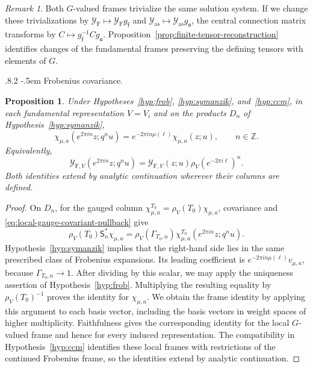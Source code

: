 \documentclass[11pt,leqno]{amsart}
\makeatletter
\numberwithin{equation}{section}
\renewcommand\paragraph{\@startsection{paragraph}{4}{\z@}%
  {.8\baselineskip \@plus .2\baselineskip}%
  {-.5em}%
  {\normalfont\normalsize\bfseries}}
\theoremstyle{plain}
\newtheorem{proposition}[theorem]{Proposition}
\theoremstyle{definition}
\theoremstyle{plain}
\theoremstyle{definition}
\theoremstyle{remark}
\newtheorem{remark}[theorem]{Remark}
\makeatother
\begin{document}
\begin{remark}\label{rem:analytic-comparison-scope}
Both $G$-valued frames trivialize the same solution system.  If we change these trivializations by $\mathcal Y_{\mathrm F}\mapsto\mathcal Y_{\mathrm F}g_{\mathfrak f}$ and $\mathcal Y_{\mathrm{as}}\mapsto\mathcal Y_{\mathrm{as}}g_{\mathfrak a}$, the central connection matrix transforms by $C\mapsto g_{\mathfrak f}^{-1}Cg_{\mathfrak a}$.  Proposition~\ref{prop:finite-tensor-reconstruction} identifies changes of the fundamental frames preserving the defining tensors with elements of $G$.
\end{remark}

\paragraph{Frobenius covariance.}
\begin{proposition}\label{prop:Frobenius-Symanzik-covariance}
Under Hypotheses~\ref{hyp:frob}, \ref{hyp:symanzik}, and~\ref{hyp:ccm}, in each fundamental representation $V=V_i$ and on the products $D_n$ of Hypothesis~\ref{hyp:symanzik},
\begin{equation}\label{eq:Frobenius-Symanzik-weight}
 \chi_{\mu,a}(e^{2\pi in}z;q^nu)
 =e^{-2\pi in\mu(\ell)}\chi_{\mu,a}(z;u),\qquad n\in\mathbb Z.
\end{equation}
Equivalently,
\begin{equation}\label{eq:Frobenius-Symanzik-frame}
 \mathcal Y_{\mathrm F,V}(e^{2\pi in}z;q^nu)
 =\mathcal Y_{\mathrm F,V}(z;u)\rho_V(e^{-2\pi i\ell})^n.
\end{equation}
Both identities extend by analytic continuation wherever their columns are defined.
\end{proposition}
\begin{proof}
On $D_n$, for the gauged column $\chi_{\mu,a}^{T_0}=\rho_V(T_0)\chi_{\mu,a}$, covariance and \eqref{eq:local-gauge-covariant-pullback} give
\[
 \rho_V(T_0)\mathsf S_n^*\chi_{\mu,a}
 =\rho_V(\Gamma_{T_0,n})\chi_{\mu,a}^{T_0}(e^{2\pi in}z;q^nu).
\]
Hypothesis~\ref{hyp:symanzik} implies that the right-hand side lies in the same prescribed class of Frobenius expansions.  Its leading coefficient is $e^{-2\pi in\mu(\ell)}v_{\mu,a}$, because $\Gamma_{T_0,n}\to1$.  After dividing by this scalar, we may apply the uniqueness assertion of Hypothesis~\ref{hyp:frob}.  Multiplying the resulting equality by $\rho_V(T_0)^{-1}$ proves the identity for $\chi_{\mu,a}$.  We obtain the frame identity by applying this argument to each basis vector, including the basis vectors in weight spaces of higher multiplicity.  Faithfulness gives the corresponding identity for the local $G$-valued frame and hence for every induced representation.  The compatibility in Hypothesis~\ref{hyp:ccm} identifies these local frames with restrictions of the continued Frobenius frame, so the identities extend by analytic continuation.
\end{proof}
\end{document}
